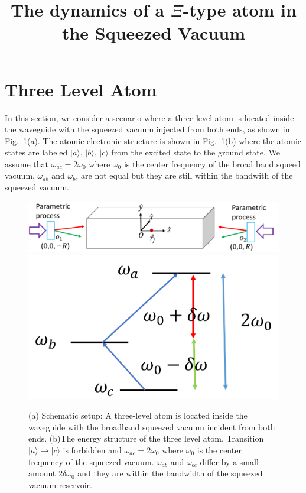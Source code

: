 \documentclass{article}
\begin{document}
\title{The dynamics of a $\Xi$-type atom in the Squeezed Vacuum}
\maketitle 



\section{Three Level Atom}
In this section, we consider a scenario where a three-level atom is located inside the waveguide with the squeezed vacuum injected from both ends, as shown in Fig.~\ref{1}(a). The atomic electronic structure is shown in Fig.~\ref{1}(b) where the atomic states are labeled $|a\rangle$, $|b\rangle$, $|c\rangle$ from the excited state to the ground state. We assume that $\omega_{ac}=2\omega_0$ where $\omega_0$ is the center frequency of the broad band squeed vacuum. $\omega_{ab}$ and $\omega_{bc}$ are not equal but they are still within the bandwith of the squeezed vacuum.  
\begin{figure}
\includegraphics[width=0.7\columnwidth]{fig1.png}
\includegraphics[width=0.25\columnwidth]{fig2.png}
\caption{(a) Schematic setup: A three-level atom is located inside the waveguide with the broadband squeezed vacuum incident from both ends. (b)The energy structure of the three level atom. Transition $|a\rangle\rightarrow|c\rangle$ is forbidden and $\omega_{ac}=2\omega_0$ where $\omega_0$ is the center frequency of the squeezed vacuum. $\omega_{ab}$ and $\omega_{bc}$ differ by a small amount $2\delta\omega_0$ and they are within the bandwidth of the squeezed vacuum reservoir.}
\label{1}
\end{figure}
\end{document}
